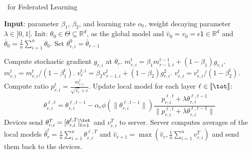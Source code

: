 \documentclass{article}
\begin{document}
\begin{algorithm}[H]
\caption{\algo\ for Federated Learning} \label{alg:ldams}
\begin{algorithmic}[1]
\STATE \textbf{Input}: parameter $\beta_1$, $\beta_2$, and learning rate $\alpha_t$, weight decaying parameter $\lambda \in ]0,1[$.
\STATE Init: $\theta_{0} \in \Theta \subseteq \mathbb R^d $, as the global model and $\hat v_0=v_{0} = \epsilon \mathsf{1} \in \mathbb R^{d}$ and $\bar{\theta}_0 =  \frac{1}{n} \sum_{i=1}^n \theta_0$.
\STATE Set $\theta_{r,i}^{0} = \bar{\theta}_{r-1}$

\STATE Compute stochastic gradient $g_{r,i}$ at $\theta_r$.
\STATE $m^t_{r,i} = \beta_1 m^{t-1}_{r-1,i} + (1 - \beta_1) g_{r,i}$. \label{line:first}
\STATE $m^{t}_{r,i}=m^{t}_{r,i} /\left(1-\beta_{1}^{t}\right)$. \label{line:new1}
\STATE $v^{t,i}_r = \beta_2 v^{t}_{r-1,i} + (1 - \beta_2) g_{r,i}^2$. \label{line:second}
\STATE $v^{t}_{r,i}=v^{t}_{r,i} /\left(1-\beta_{2}^{t}\right)$. \label{line:new2}
\STATE Compute ratio  $p_{r,i}^t=\frac{m^{t}_{r,i}}{\sqrt{\hat v_{r}}+\epsilon}$. \label{line:scale}
\STATE Update local model for each layer $\ell \in \llbracket \tot \rrbracket$: \label{line:layer}
$$\theta_{r,i}^{\ell,t}=\theta_{r,i}^{\ell,t-1}-\alpha_{r} \phi(\|\theta_{r,i}^{\ell,t-1}\|)\frac{p_{r,i}^{\ell,t}+\lambda \theta_{r,i}^{\ell,t-1}}{ \|p_{r,i}^{\ell,t}+\lambda \theta_{r,i}^{\ell,t-1}\|}$$
\ENDFOR
\STATE Devices send $\theta_{r,i}^{T} = [\theta_{r,i}^{\ell,T}]_{\ell =1}^{\tot}$ and $v_{r,i}^T$ to server.
\ENDFOR
\STATE Server computes averages of the local models $\bar{\theta}_r^\ell = \frac{1}{n} \sum_{i=1}^n \theta_{r,i}^{\ell,T}$ and $\hat{v}_{r+1} = \max( \hat{v}_{r},\frac{1}{n} \sum_{i=1}^n v^T_{r,i} )$ and send them back to the devices. \label{line:final}
\ENDFOR
\end{algorithmic}
\end{algorithm}
\end{document}
